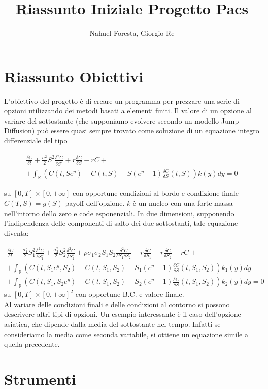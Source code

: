 \documentclass[a4paper,10pt]{article}
\title{Riassunto Iniziale Progetto Pacs}
\author{Nahuel Foresta, Giorgio Re}
\newcommand{\der}[2]{\frac{\delta #1}{\delta #2}}
\newcommand{\dder}[2]{\frac{\delta^2 #1}{\delta #2^2}}
\newcommand{\dmix}[3]{\frac{\delta^2 #1}{\delta #2 \delta #3}}
\begin{document}
\maketitle

\section{Riassunto Obiettivi}

L'obiettivo del progetto è di creare un programma per prezzare una serie di opzioni utilizzando dei metodi basati a elementi finiti. Il valore di un opzione al variare del sottostante (che supponiamo evolvere secondo un modello Jump-Diffusion) può essere quasi sempre trovato come soluzione di un equazione integro differenziale del tipo

\begin{multline}
 \der{C}{t}+\frac{\sigma^2}{2}S^2\dder{C}{S}+r\der{C}{S}-rC+\\+ \int_\mathbb{R}\left(C(t,Se^y)-C(t,S)-S(e^y-1)\der{C}{S}(t,S)\right)k(y)dy=0
\end{multline}

su $[0,T]\times[0,+\infty]$ con opportune condizioni al bordo e condizione finale $C(T,S)=g(S)$ payoff dell'opzione. $k$ è un nucleo con una forte massa nell'intorno dello zero e code esponenziali.
In due dimensioni, supponendo l'indipendenza delle componenti di salto dei due sottostanti, tale equazione diventa:


\begin{multline}
 \der{C}{t}+\frac{\sigma_1^2}{2}S_1^2\dder{C}{S_1}+\frac{\sigma_2^2}{2}S_2^2\dder{C}{S_2}+\rho\sigma_1\sigma_2 S_1 S_2 \dmix{C}{S_1}{S_2}+
 r\der{C}{S_1}+r\der{C}{S_2}-rC+ \\
 + \int_\mathbb{R}\left(C(t,S_1e^{y},S_2)-C(t,S_1,S_2)-S_1(e^y-1)\der{C}{S}(t,S_1,S_2)\right)k_1(y)dy\\
 + \int_\mathbb{R}\left(C(t,S_1,S_2e^{y})-C(t,S_1,S_2)-S_2(e^y-1)\der{C}{S}(t,S_1,S_2)\right)k_2(y)dy=0 
\end{multline}
su $[0,T]\times[0,+\infty]^2$ con opportune B.C. e valore finale.
\\
Al variare delle condizioni finali e delle condizioni al contorno si possono descrivere altri tipi di opzioni. Un esempio interessante è il caso dell'opzione asiatica, che dipende dalla media del sottostante nel tempo. Infatti se consideriamo la media come seconda variabile, si ottiene un equazione simile a quella precedente.

\section{Strumenti}
\end{document}
